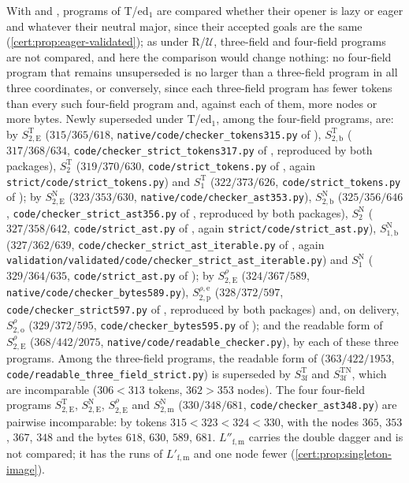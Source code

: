 With  and , programs of T/ed$_1$ are
compared whether their opener is lazy or eager and whatever their neutral major,
since their accepted goals are the same (\cref{cert:prop:eager-validated}); as under
R/$\mathcal U$, three-field and four-field programs are not compared, and here the
comparison would change nothing: no four-field program that remains unsuperseded is
no larger than a three-field program in all three coordinates, or conversely, since
each three-field program has fewer tokens than every such four-field program and,
against each of them, more nodes or more bytes.
Newly superseded under T/ed$_1$, among the four-field programs,
are: by $S^{\mathrm T}_{2,\mathrm E}$ ($315/365/618$,
\texttt{native/code/checker\_tokens315.py} of ),
$S^{\mathrm T}_{2,\mathrm b}$ ($317/368/634$, \texttt{code/checker\_strict\_tokens317.py}
of , reproduced by both packages), $S^{\mathrm T}_2$
($319/370/630$, \texttt{code/strict\_tokens.py} of , again
\texttt{strict/code/strict\_tokens.py}) and $S^{\mathrm T}_1$ ($322/373/626$,
\texttt{code/strict\_tokens.py} of ); by
$S^{\mathrm N}_{2,\mathrm E}$ ($323/353/630$, \texttt{native/code/checker\_ast353.py}),
$S^{\mathrm N}_{2,\mathrm b}$ ($325/356/646$, \texttt{code/checker\_strict\_ast356.py} of
, reproduced by both packages), $S^{\mathrm N}_2$
($327/358/642$, \texttt{code/strict\_ast.py} of , again
\texttt{strict/code/strict\_ast.py}), $S^{\mathrm N}_{1,\mathrm b}$ ($327/362/639$,
\texttt{code/checker\_strict\_ast\_iterable.py} of , again
\texttt{validation/validated/code/checker\_strict\_ast\_iterable.py}) and
$S^{\mathrm N}_1$ ($329/364/635$, \texttt{code/strict\_ast.py} of
); by $S^{\rho}_{2,\mathrm E}$ ($324/367/589$,
\texttt{native/code/checker\_bytes589.py}), $S^{\rho,\mathrm e}_{2,\mathrm p}$
($328/372/597$, \texttt{code/checker\_strict597.py} of
, reproduced by both packages) and, on delivery,
$S^{\rho}_{2,\mathrm o}$ ($329/372/595$, \texttt{code/checker\_bytes595.py} of
); and the readable form of $S^{\rho}_{2,\mathrm E}$
($368/442/2075$, \texttt{native/code/readable\_checker.py}), by each of these three
programs. Among the three-field programs, the readable form of
 ($363/422/1953$,
\texttt{code/readable\_three\_field\_strict.py}) is superseded by
$S^{\mathrm T}_{3\mathrm f}$ and $S^{\mathrm{TN}}_{3\mathrm f}$, which are incomparable
($306<313$ tokens, $362>353$ nodes). The four four-field programs
$S^{\mathrm T}_{2,\mathrm E}$, $S^{\mathrm N}_{2,\mathrm E}$, $S^{\rho}_{2,\mathrm E}$ and
$S^{\mathrm N}_{2,\mathrm m}$ ($330/348/681$, \texttt{code/checker\_ast348.py}) are
pairwise incomparable: by tokens $315<323<324<330$, with the nodes $365$, $353$, $367$,
$348$ and the bytes $618$, $630$, $589$, $681$. $L''_{\mathrm{f,m}}$ carries the double
dagger and is not compared; it has the runs of $L'_{\mathrm{f,m}}$ and one node fewer
(\cref{cert:prop:singleton-image}).

